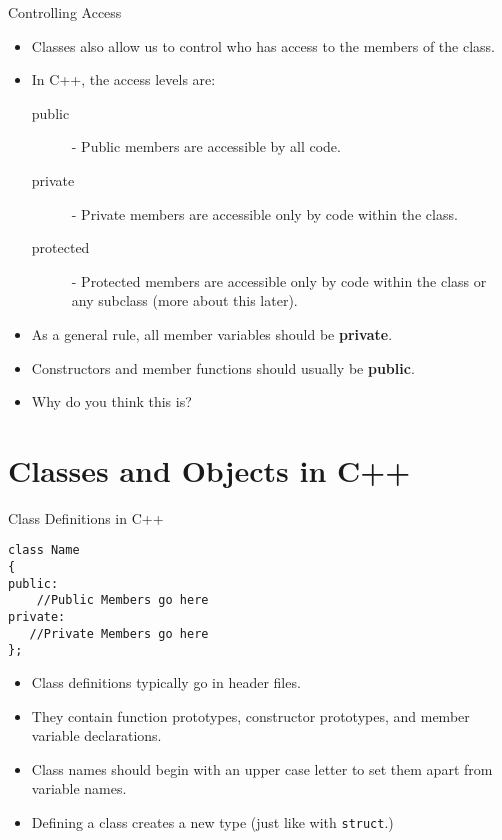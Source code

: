 \documentclass[]{beamer}
\begin{document}
\begin{frame}{Controlling Access}
    \begin{itemize}[<+->]
        \item Classes also allow us to control who has access to the
            members of the class.
        \item In C++, the access levels are:
            \begin{description}
                \item[public] - Public members are accessible
                    by all code.
                \item[private] - Private members are accessible only
                    by code within the class.
                \item[protected] - Protected members are accessible
                    only by code within the class or any subclass
                    (more about this later).
            \end{description}
        \item As a general rule, all member variables should be
            \textbf{private}.
        \item Constructors and member functions should usually be
            \textbf{public}.  
        \item Why do you think this is?
    \end{itemize}
\end{frame}

\section{Classes and Objects in C++}

\begin{frame}[fragile]{Class Definitions in C++}
\begin{BVerbatim}
class Name
{
public:
    //Public Members go here
private:
   //Private Members go here
};
\end{BVerbatim}

\begin{itemize}[<+(1)->]
    \item Class definitions typically go in header files.
    \item They contain function prototypes, constructor prototypes,
        and member variable declarations.
    \item Class names should begin with an upper case letter to set
        them apart from variable names.
    \item Defining a class creates a new type (just like with
        \texttt{struct}.)
\end{itemize}
\end{frame}
\end{document}
